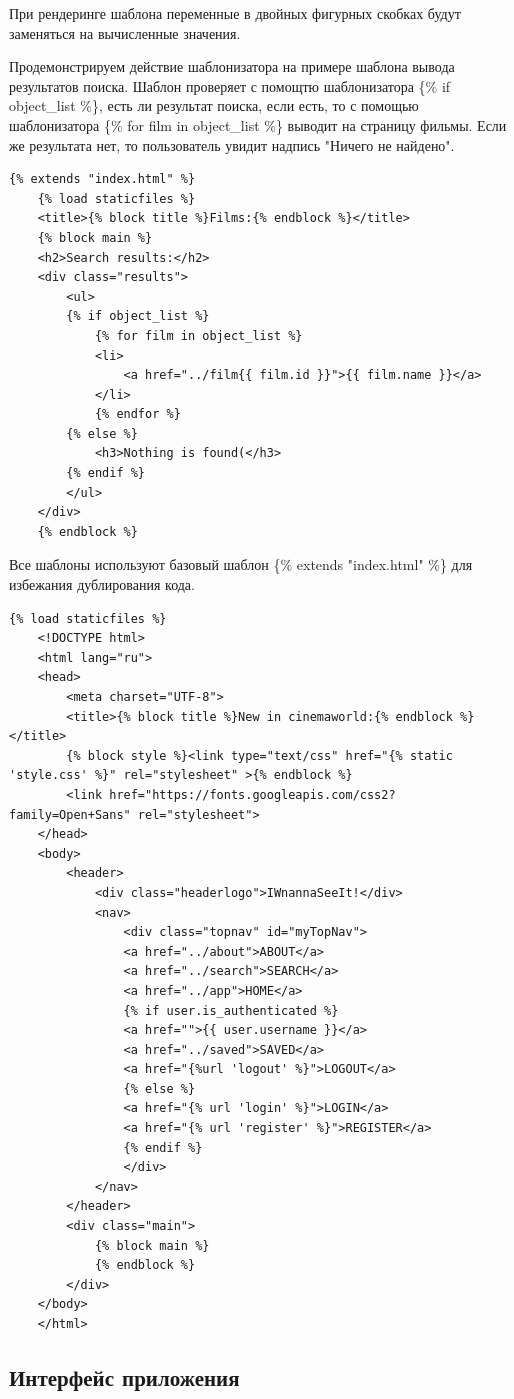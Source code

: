 \documentclass[a4paper, 14pt]{article}
\begin{document}
	При рендеринге шаблона переменные в двойных фигурных скобках будут заменяться на вычисленные значения.
	
	Продемонстрируем действие шаблонизатора на примере шаблона вывода результатов поиска. Шаблон проверяет с помощтю шаблонизатора \{\% if object\_list \%\}, есть ли результат поиска, если есть, то с помощью шаблонизатора \{\% for film in object\_list \%\} выводит на страницу фильмы. Если же результата  нет, то пользователь увидит надпись "Ничего не найдено".
	
	\newpage
	\begin{lstlisting}[label=some-code,caption=Шаблон search\_results.html]
	{% extends "index.html" %}
	{% load staticfiles %}
	<title>{% block title %}Films:{% endblock %}</title>
	{% block main %}
	<h2>Search results:</h2>
	<div class="results">
		<ul>
		{% if object_list %}
			{% for film in object_list %}
			<li>
				<a href="../film{{ film.id }}">{{ film.name }}</a>
			</li>
			{% endfor %}
		{% else %}
			<h3>Nothing is found(</h3>
		{% endif %}
		</ul>
	</div>
	{% endblock %}
	\end{lstlisting}
	
	Все шаблоны используют базовый шаблон \{\% extends "index.html" \%\} для избежания дублирования кода.
	
	\begin{lstlisting}[label=some-code,caption=Шаблон search\_results.html]
	{% load staticfiles %}
	<!DOCTYPE html>
	<html lang="ru">
	<head>
		<meta charset="UTF-8">
		<title>{% block title %}New in cinemaworld:{% endblock %}</title>
		{% block style %}<link type="text/css" href="{% static 'style.css' %}" rel="stylesheet" >{% endblock %}
		<link href="https://fonts.googleapis.com/css2?family=Open+Sans" rel="stylesheet">
	</head>
	<body>
		<header>
			<div class="headerlogo">IWnannaSeeIt!</div>
			<nav>
				<div class="topnav" id="myTopNav">
				<a href="../about">ABOUT</a>
				<a href="../search">SEARCH</a>
				<a href="../app">HOME</a>
				{% if user.is_authenticated %}
				<a href="">{{ user.username }}</a>
				<a href="../saved">SAVED</a>
				<a href="{%url 'logout' %}">LOGOUT</a>
				{% else %}
				<a href="{% url 'login' %}">LOGIN</a>
				<a href="{% url 'register' %}">REGISTER</a>
				{% endif %}
				</div>
			</nav>
		</header>
		<div class="main">
			{% block main %}
			{% endblock %}
		</div>
	</body>
	</html>
	\end{lstlisting}
	\newpage
	
	\subsection{Интерфейс приложения}
	
\end{document}
